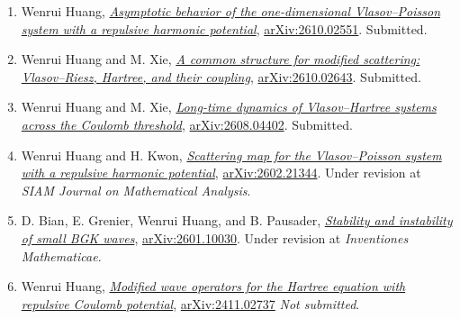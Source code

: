 \documentclass[11pt]{article}
\begin{document}
\begin{enumerate}
    \item Wenrui Huang,
    \href{https://arxiv.org/abs/2610.02551}
    {\emph{Asymptotic behavior of the one-dimensional Vlasov--Poisson system
    with a repulsive harmonic potential}},
    \href{https://arxiv.org/abs/2610.02551}{arXiv:2610.02551}.
    Submitted.
 
    \item Wenrui Huang and M. Xie,
    \href{https://arxiv.org/abs/2610.02643}
    {\emph{A common structure for modified scattering: Vlasov--Riesz, Hartree,
    and their coupling}},
    \href{https://arxiv.org/abs/2610.02643}{arXiv:2610.02643}.
    Submitted.
 
    \item Wenrui Huang and M. Xie,
    \href{https://arxiv.org/abs/2608.04402}
    {\emph{Long-time dynamics of Vlasov--Hartree systems across the Coulomb
    threshold}},
    \href{https://arxiv.org/abs/2608.04402}{arXiv:2608.04402}.
    Submitted.
 
    \item Wenrui Huang and H. Kwon,
    \href{https://arxiv.org/abs/2602.21344}
    {\emph{Scattering map for the Vlasov--Poisson system with a repulsive
    harmonic potential}},
    \href{https://arxiv.org/abs/2602.21344}{arXiv:2602.21344}.
    Under revision at \emph{SIAM Journal on Mathematical Analysis}.
 
    \item  D. Bian, E. Grenier, Wenrui Huang, and B. Pausader,
    \href{https://arxiv.org/abs/2601.10030}
    {\emph{Stability and instability of small BGK waves}},
    \href{https://arxiv.org/abs/2601.10030}{arXiv:2601.10030}.
    Under revision at \emph{Inventiones Mathematicae}.
 
    \item Wenrui Huang,
    \href{https://arxiv.org/abs/2411.02737}
    {\emph{Modified wave operators for the Hartree equation with repulsive
    Coulomb potential}},
    \href{https://arxiv.org/abs/2411.02737}{arXiv:2411.02737} \emph{Not submitted}.
\end{enumerate}
 
\end{document}
